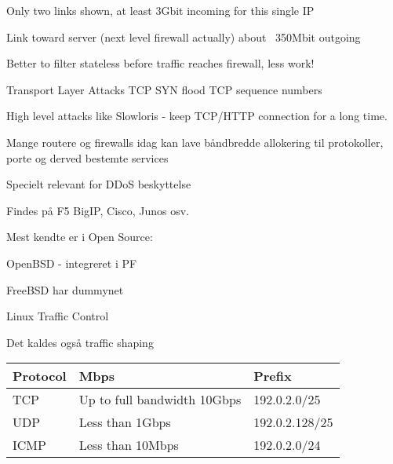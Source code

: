 \documentclass[Screen16to9,17pt]{foils}
\begin{document}

\centerline{Only two links shown, at least 3Gbit incoming for this single IP}

\centerline{Link toward server (next level firewall actually) about ~350Mbit outgoing}

Better to filter stateless before traffic reaches firewall, less work!





\begin{list2}
\item Transport Layer Attacks TCP SYN flood TCP sequence numbers
\item High level attacks like Slowloris - keep TCP/HTTP connection for a long time.
\end{list2}


\begin{list1}
\item Mange routere og firewalls idag kan lave båndbredde allokering til
  protokoller, porte og derved bestemte services
  \item Specielt relevant for DDoS beskyttelse
  \item Findes på F5 BigIP, Cisco, Junos osv.
\item Mest kendte er i Open Source:
\begin{list2}
\item OpenBSD - integreret i PF
\item FreeBSD har dummynet
\item Linux Traffic Control
\end{list2}
\item Det kaldes også traffic shaping
\end{list1}




\begin{tabularx}{\textwidth-5cm}{|p{5cm}|p{7cm}|X|} \hline
{\bf Protocol} & {\bf Mbps} & {\bf Prefix}\\\hline
TCP & Up to full bandwidth 10Gbps & 192.0.2.0/25 \\\hline
UDP & Less than 1Gbps & 192.0.2.128/25 \\\hline
ICMP & Less than 10Mbps & 192.0.2.0/24 \\\hline
\end{tabularx}
\end{document}
